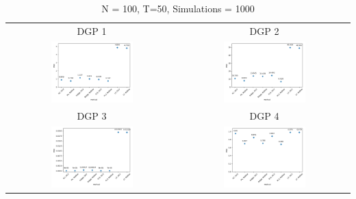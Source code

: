 \begin{table}[h! ]
    \centering
    \caption*{N = 100, T=50, Simulations = 1000}
    \begin{tabular}{c c}
    DGP 1 & DGP 2 \\
        \includegraphics[width=0.5\textwidth]{figures/N100_T50_DGP1_Sims1000.png} & \includegraphics[width=0.5\textwidth]{figures/N100_T50_DGP2_Sims1000.png} \\
        DGP 3 & DGP 4 \\
        \includegraphics[width=0.5\textwidth]{figures/N100_T50_DGP3_Sims1000} &
        \includegraphics[width=0.5\textwidth]{figures/N100_T50_DGP4_Sims1000} \\

\end{tabular}
\end{table}
